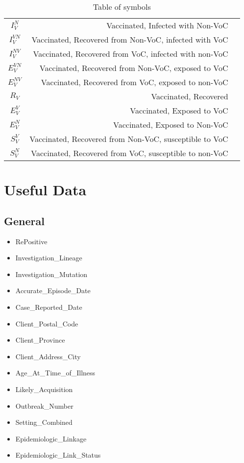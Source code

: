 \documentclass{article}
\begin{document}
\begin{table}[h!]
\begin{center}
\begin{tabular}{c|r|c}
        $I^N_V$ & Vaccinated, Infected with Non-VoC & \\
        $I^{VN}_V$ & Vaccinated, Recovered from Non-VoC, infected with VoC & \\
        $I^{NV}_V$ & Vaccinated, Recovered from VoC, infected with non-VoC & \\
        $E^{VN}_V$ & Vaccinated, Recovered from Non-VoC, exposed to VoC & \\
        $E^{NV}_V$ & Vaccinated, Recovered from VoC, exposed to non-VoC & \\
        $R_V$ & Vaccinated, Recovered & \\
        $E^V_V$ & Vaccinated, Exposed to VoC & \\
        $E^N_V$ & Vaccinated, Exposed to Non-VoC & \\
        $S^V_V$ & Vaccinated, Recovered from Non-VoC, susceptible to VoC  & \\
        $S^N_V$ & Vaccinated, Recovered from VoC, susceptible to non-VoC  & \\
    \end{tabular}
    \caption{Table of symbols}
    \end{center}
\end{table}


\newpage
\clearpage
\section{Useful Data}
\subsection{General}
\begin{itemize}
    \item RePositive
    \item Investigation\_Lineage
    \item Investigation\_Mutation
    \item Accurate\_Episode\_Date
    \item Case\_Reported\_Date
    \item Client\_Postal\_Code
    \item Client\_Province
    \item Client\_Address\_City
    \item Age\_At\_Time\_of\_Illness
    \item Likely\_Acquisition
    \item Outbreak\_Number
    \item Setting\_Combined
    \item Epidemiologic\_Linkage
    \item Epidemiologic\_Link\_Status
\end{itemize}
\end{document}
